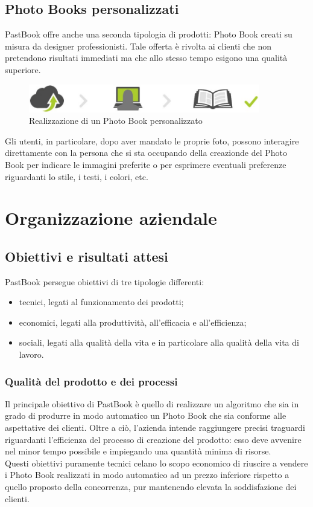 		\subsection{Photo Books personalizzati}
			PastBook offre anche una seconda tipologia di prodotti: Photo Book creati su misura da designer professionisti. Tale offerta
			è rivolta ai clienti che non pretendono risultati immediati ma che allo stesso tempo esigono una qualità superiore.
			\begin{figure}[H]
				\centering
				\includegraphics[width=0.9\textwidth]{capitolo_1/immagini/photo_book_personalizzato.png}
				\caption[Realizzazione di un Photo Book personalizzato]{Realizzazione di un Photo Book personalizzato\protect\footnotemark}
			\end{figure}
			Gli utenti, in particolare, dopo aver mandato le proprie foto, possono interagire direttamente con la persona che si sta
			occupando della creazionde del Photo Book per indicare le immagini preferite o per esprimere eventuali preferenze
			riguardanti lo stile, i testi, i colori, etc.
	\section{Organizzazione aziendale}
		\subsection{Obiettivi e risultati attesi}
			PastBook persegue obiettivi di tre tipologie differenti:
			\begin{itemize}
				\item tecnici, legati al funzionamento dei prodotti;
				\item economici, legati alla produttività, all'efficacia e all'efficienza;
				\item sociali, legati alla qualità della vita e in particolare alla qualità della vita di lavoro.
			\end{itemize}
			\subsubsection{Qualità del prodotto e dei processi}
				Il principale obiettivo di PastBook è quello di realizzare un algoritmo che sia in grado di produrre in modo
				automatico un Photo Book che sia conforme alle aspettative dei clienti. Oltre a ciò, l'azienda intende raggiungere
				precisi traguardi riguardanti l'efficienza del processo di creazione del prodotto: esso deve avvenire nel minor tempo
				possibile e impiegando una quantità minima di risorse.\\
				Questi obiettivi puramente tecnici celano lo scopo economico di riuscire a vendere i Photo Book realizzati in modo
				automatico ad un prezzo inferiore rispetto a quello proposto della concorrenza, pur mantenendo elevata la
				soddisfazione dei clienti.
